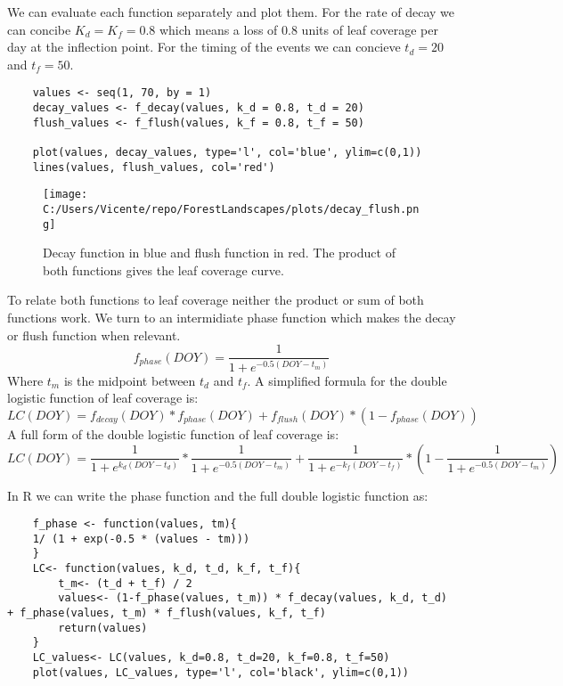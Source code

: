\documentclass{article}
\begin{document}
We can evaluate each function separately and plot them. For the rate of decay we can concibe $K_d = K_f = 0.8$  which means a loss
of 0.8 units of leaf coverage per day at the inflection point. For the timing of the events we can concieve $t_d = 20$ and $t_f = 50$.
\begin{verbatim}
    values <- seq(1, 70, by = 1)
    decay_values <- f_decay(values, k_d = 0.8, t_d = 20)
    flush_values <- f_flush(values, k_f = 0.8, t_f = 50)

    plot(values, decay_values, type='l', col='blue', ylim=c(0,1))
    lines(values, flush_values, col='red') 
\end{verbatim}
\begin{figure}
    \centering
    \texttt{[image: C:/Users/Vicente/repo/ForestLandscapes/plots/decay\_flush.png]}
    \caption{Decay function in blue and flush function in red. The product of both functions gives the leaf coverage curve.}
    \label{fig:double_logistic_functions}
\end{figure}

To relate both functions to leaf coverage neither the product or sum of both functions work.
We turn to an intermidiate phase function which makes the decay or flush function when relevant. 
\begin{equation}
    f_{phase}(DOY)= \frac{1}{1 + e^{-0.5 (DOY - t_m)}}
\end{equation}
Where $t_m$ is the midpoint between $t_d$ and $t_f$.
A simplified formula for the double logistic function of leaf coverage is:
\begin{equation}
    LC(DOY)= f_{decay}(DOY) * f_{phase}(DOY) + f_{flush}(DOY) * (1 - f_{phase}(DOY))
\end{equation}
A full form of the double logistic function of leaf coverage is:
\begin{equation}
    LC(DOY)= \frac{1}{1 + e^{k_{d}(DOY - t_{d})}} * \frac{1}{1 + e^{-0.5 (DOY - t_m)}} + \frac{1}{1 + e^{-k_{f}(DOY - t_{f})}} * \left(1 - \frac{1}{1 + e^{-0.5 (DOY - t_m)}}\right)
\end{equation}

In R we can write the phase function and the full double logistic function as:
\begin{verbatim}
    f_phase <- function(values, tm){
    1/ (1 + exp(-0.5 * (values - tm)))   
    }
    LC<- function(values, k_d, t_d, k_f, t_f){
        t_m<- (t_d + t_f) / 2
        values<- (1-f_phase(values, t_m)) * f_decay(values, k_d, t_d) + f_phase(values, t_m) * f_flush(values, k_f, t_f)
        return(values)
    }
    LC_values<- LC(values, k_d=0.8, t_d=20, k_f=0.8, t_f=50)
    plot(values, LC_values, type='l', col='black', ylim=c(0,1))
\end{verbatim}
\end{document}
